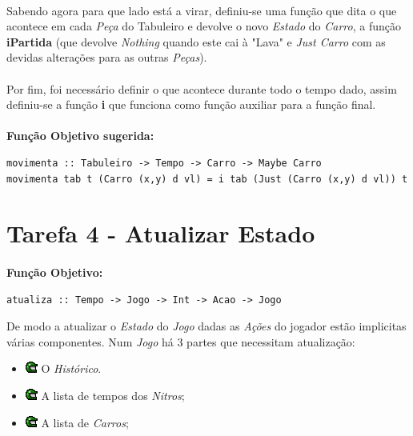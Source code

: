 \documentclass[12pt,a4paper]{report}
\begin{document}
\paragraph{} Sabendo agora para que lado está a virar, definiu-se uma função que dita o que acontece em cada \textit{Peça} do Tabuleiro e devolve o novo \textit{Estado} do \textit{Carro}, a função \textbf{iPartida} (que devolve \textit{Nothing} quando este cai à "Lava" e \textit{Just Carro} com as devidas alterações para as outras \textit{Peças}).

\paragraph{} Por fim, foi necessário definir o que acontece durante todo o tempo dado, assim definiu-se a função \textbf{i} que funciona como função auxiliar para a função final.

\paragraph{}\textbf{Função Objetivo sugerida:}

\begin{verbatim}
movimenta :: Tabuleiro -> Tempo -> Carro -> Maybe Carro
movimenta tab t (Carro (x,y) d vl) = i tab (Just (Carro (x,y) d vl)) t 
\end{verbatim}


\newpage
\section{Tarefa 4 - Atualizar Estado}
\label{Tarefa4_2017li1g77}

\paragraph{}\textbf{Função Objetivo:}

\begin{verbatim}
atualiza :: Tempo -> Jogo -> Int -> Acao -> Jogo
\end{verbatim}

De modo a atualizar o \textit{Estado} do \textit{Jogo} dadas as \textit{Ações} do jogador estão implicitas várias componentes.
\newline Num \textit{Jogo} há 3 partes que necessitam atualização:

\begin{itemize}
\item[]\includegraphics[scale=0.7]{p2.png} O \textit{Histórico}.
\item[]\includegraphics[scale=0.7]{p2.png} A lista de tempos dos \textit{Nitros};
\item[]\includegraphics[scale=0.7]{p2.png} A lista de \textit{Carros};
\end{itemize}
 
\end{document}
